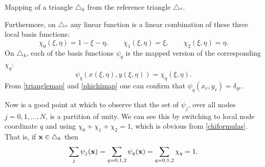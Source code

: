 \begin{marginfigure}

\caption{Mapping of a triangle $\triangle_k$ from the reference triangle $\triangle_\ast$.}
\label{fig:isoparametric}
\end{marginfigure}

\noindent Furthermore, on $\triangle_\ast$ any linear function is a linear combination of these three local basis functions:
\begin{equation}
\chi_0(\xi,\eta) = 1-\xi-\eta, \qquad \chi_1(\xi,\eta) = \xi, \qquad \chi_2(\xi,\eta) = \eta. \label{chiformulas}
\end{equation}
On $\triangle_k$, each of the basis functions $\psi_q$ is the mapped version of the corresponding $\chi_q$:
\begin{equation}
\psi_q(x(\xi,\eta),y(\xi,\eta)) = \chi_q(\xi,\eta). \label{phichimap}
\end{equation}
From \eqref{trianglemap} and \eqref{phichimap} one can confirm that $\psi_q(x_r,y_r) = \delta_{qr}$.

Now is a good point at which to observe that the set of $\psi_j$, over all nodes $j=0,1,\dots,N$, is a partition of unity.  We can see this by switching to local node coordinate $q$ and using $\chi_0+\chi_1+\chi_2=1$, which is obvious from \eqref{chiformulas}.  That is, if $\mathbf{x} \in \triangle_k$ then
\begin{equation}
   \sum_j \psi_j(\mathbf{x}) = \sum_{q=0,1,2} \psi_q(\mathbf{x}) = \sum_{q=0,1,2} \chi_q =1.  \label{partitionofunity}
\end{equation}

